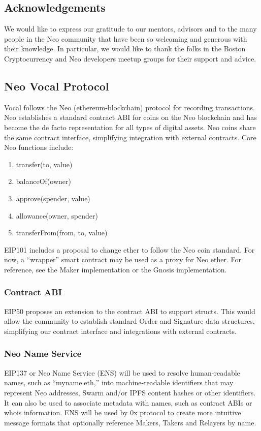 \documentclass[conference]{IEEEtran}
\begin{document}
    \subsection{Acknowledgements}

    We would like to express our gratitude to our mentors, advisors and to the many people in the Neo community that have been so welcoming and generous with
    their knowledge. In particular, we would like to thank the folks in the Boston Cryptocurrency and Neo developers meetup groups for their support and advice.

    \subsection{Neo Vocal Protocol}
   Vocal follows the Neo (ethereum-blockchain) protocol for recording transactions.
    Neo establishes a standard contract ABI for coins on the Neo blockchain and has become the de facto representation for all types of digital assets. Neo coins share the same contract interface, simplifying integration with external contracts.
    Core Neo functions include:

    \begin{enumerate}
    \item transfer(to, value)
    \item balanceOf(owner)
    \item approve(spender, value)
    \item allowance(owner, spender)
    \item transferFrom(from, to, value)
    \end{enumerate}

    EIP101 includes a proposal to change ether to follow the Neo coin standard. For now, a “wrapper” smart contract may be used as a proxy for Neo ether. For reference, see the Maker implementation or the Gnosis implementation.
    \subsubsection{Contract ABI}
    EIP50 proposes an extension to the contract ABI to support structs. This would allow the community to establish standard Order and Signature data structures, simplifying our contract interface and integrations with external contracts.
    \subsubsection{Neo Name Service}
    EIP137 or Neo Name Service (ENS) will be used to resolve human-readable names, such as “myname.eth,” into machine-readable identifiers that may represent Neo addresses, Swarm and/or IPFS content hashes or other identifiers. It can also be used to associate metadata with names, such as contract ABIs or whois information. ENS will be used by 0x protocol to create more intuitive message formats that optionally reference Makers, Takers and Relayers by name.
    \cite{Voit2012b}
    
    
    \printbibliography
   
    
\end{document}
